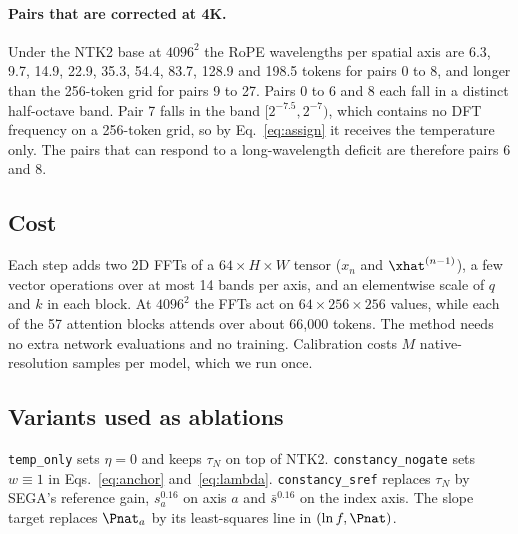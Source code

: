\paragraph{Pairs that are corrected at 4K.}
Under the NTK2 base at $4096^2$ the RoPE wavelengths per spatial axis are 6.3, 9.7, 14.9, 22.9, 35.3, 54.4, 83.7, 128.9 and 198.5 tokens for pairs 0 to 8, and longer than the 256-token grid for pairs 9 to 27. Pairs 0 to 6 and 8 each fall in a distinct half-octave band. Pair 7 falls in the band $[2^{-7.5},2^{-7})$, which contains no DFT frequency on a 256-token grid, so by Eq.~\eqref{eq:assign} it receives the temperature only. The pairs that can respond to a long-wavelength deficit are therefore pairs 6 and 8.

\subsection{Cost}
\label{sec:cost}
Each step adds two 2D FFTs of a $64\times H\times W$ tensor ($x_n$ and $\xhat^{(n-1)}$), a few vector operations over at most 14 bands per axis, and an elementwise scale of $q$ and $k$ in each block. At $4096^2$ the FFTs act on $64\times256\times256$ values, while each of the 57 attention blocks attends over about 66{,}000 tokens. The method needs no extra network evaluations and no training. Calibration costs $M$ native-resolution samples per model, which we run once. 

\subsection{Variants used as ablations}
\label{sec:variants}
\texttt{temp\_only} sets $\eta=0$ and keeps $\tau_N$ on top of NTK2. \texttt{constancy\_nogate} sets $w\equiv1$ in Eqs.~\eqref{eq:anchor} and~\eqref{eq:lambda}. \texttt{constancy\_sref} replaces $\tau_N$ by SEGA's reference gain, $s_a^{0.16}$ on axis $a$ and $\bar s^{0.16}$ on the index axis. The slope target replaces $\Pnat_a$ by its least-squares line in $(\ln f,\Pnat)$.
